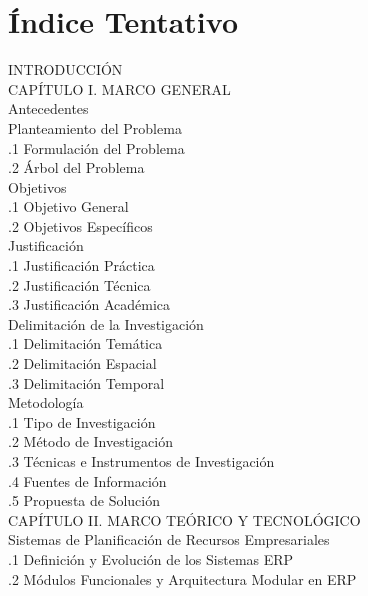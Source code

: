 \documentclass{univalle-perfil}
\begin{document}
\section{Índice Tentativo}

\begin{indicetentativo}
INTRODUCCIÓN \\[2pt]
CAPÍTULO I. MARCO GENERAL \\
 Antecedentes \\
 Planteamiento del Problema \\
\quad{}.1 Formulación del Problema \\
\quad{}.2 Árbol del Problema \\
 Objetivos \\
\quad{}.1 Objetivo General \\
\quad{}.2 Objetivos Específicos \\
 Justificación \\
\quad{}.1 Justificación Práctica \\
\quad{}.2 Justificación Técnica \\
\quad{}.3 Justificación Académica \\
 Delimitación de la Investigación \\
\quad{}.1 Delimitación Temática \\
\quad{}.2 Delimitación Espacial \\
\quad{}.3 Delimitación Temporal \\
 Metodología \\
\quad{}.1 Tipo de Investigación \\
\quad{}.2 Método de Investigación \\
\quad{}.3 Técnicas e Instrumentos de Investigación \\
\quad{}.4 Fuentes de Información \\
\quad{}.5 Propuesta de Solución \\[2pt]
CAPÍTULO II. MARCO TEÓRICO Y TECNOLÓGICO \\
 Sistemas de Planificación de Recursos Empresariales \\
\quad{}.1 Definición y Evolución de los Sistemas ERP \\
\quad{}.2 Módulos Funcionales y Arquitectura Modular en ERP \\

\end{indicetentativo}
\end{document}
